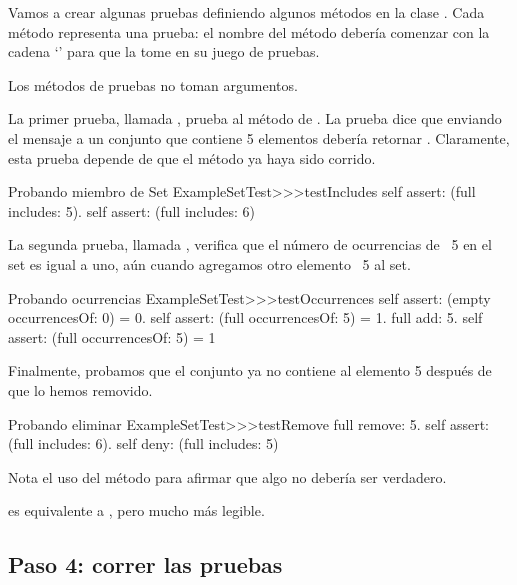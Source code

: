 \documentclass[a4paper,10pt,twoside]{book}
\begin{document}
Vamos a crear algunas pruebas definiendo algunos m\'etodos en la clase .  
Cada m\'etodo representa una prueba: 
el nombre del m\'etodo deber\'ia comenzar con la cadena `' para que \sunit
la tome en su juego de pruebas.

Los m\'etodos de pruebas no toman argumentos.

La primer prueba, llamada , prueba al m\'etodo
 de .  La prueba dice que enviando el mensaje  a un conjunto
que contiene 5 elementos deber\'ia retornar .  Claramente, esta prueba depende de que el
m\'etodo  ya haya sido corrido.

\begin{method}[testIncludes]{Probando miembro de Set}
ExampleSetTest>>>testIncludes
	self assert: (full includes: 5).
	self assert: (full includes: 6)
\end{method}

La segunda prueba, llamada , verifica que el n\'umero de ocurrencias
de ~5 en el set  es igual a uno, a\'un cuando agregamos otro elemento ~5 al set.

\begin{method}[testOccurrences]{Probando ocurrencias}
ExampleSetTest>>>testOccurrences
	self assert: (empty occurrencesOf: 0) = 0.
	self assert: (full occurrencesOf: 5) = 1.
	full add: 5.
	self assert: (full occurrencesOf: 5) = 1
\end{method}

Finalmente, probamos que el conjunto ya no contiene al elemento 5 despu\'es de que lo hemos removido.

\begin{method}[testRemove]{Probando eliminar}
ExampleSetTest>>>testRemove
	full remove: 5.
	self assert: (full includes: 6).
	self deny: (full includes: 5)
\end{method}

\noindent

Nota el uso del m\'etodo  para afirmar que algo no deber\'ia ser 
 verdadero.

 es equivalente a , pero mucho m\'as legible.
\subsection{Paso 4: correr las pruebas}
\end{document}
